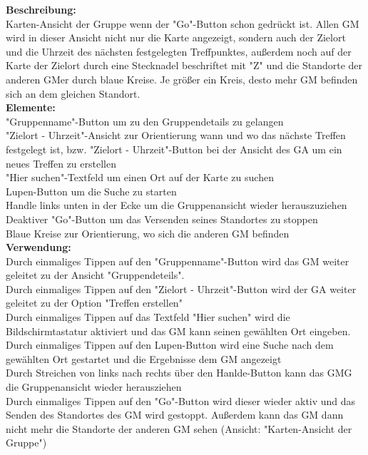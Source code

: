 \textbf{Beschreibung:}\\
Karten-Ansicht der Gruppe wenn der "Go"-Button schon gedrückt ist. Allen GM wird in dieser Ansicht nicht nur die Karte angezeigt, sondern auch der Zielort und die Uhrzeit des nächsten festgelegten Treffpunktes, außerdem noch auf der Karte der Zielort durch eine Stecknadel beschriftet mit "Z" und die Standorte der anderen GMer durch blaue Kreise. Je größer ein Kreis, desto mehr GM befinden sich an dem gleichen Standort.\\
\textbf{Elemente:}\\
"Gruppenname"-Button um zu den Gruppendetails zu gelangen\\
"Zielort - Uhrzeit"-Ansicht zur Orientierung wann und wo das nächste Treffen festgelegt ist, bzw. "Zielort - Uhrzeit"-Button bei der Ansicht des GA um ein neues Treffen zu erstellen\\
"Hier suchen"-Textfeld um einen Ort auf der Karte zu suchen\\
Lupen-Button um die Suche zu starten\\
Handle links unten in der Ecke um die Gruppenansicht wieder herauszuziehen\\
Deaktiver "Go"-Button um das Versenden seines Standortes zu stoppen\\
Blaue Kreise zur Orientierung, wo sich die anderen GM befinden\\
\textbf{Verwendung:}\\
Durch einmaliges Tippen auf den "Gruppenname"-Button wird das GM weiter geleitet zu der Ansicht "Gruppendeteils".\\
Durch einmaliges Tippen auf den "Zielort - Uhrzeit"-Button wird der GA weiter geleitet zu der Option "Treffen erstellen"\\
Durch einmaliges Tippen auf das Textfeld "Hier suchen" wird die Bildschirmtastatur aktiviert und das GM kann seinen gewählten Ort eingeben.\\
Durch einmaliges Tippen auf den Lupen-Button wird eine Suche nach dem gewählten Ort gestartet und die Ergebnisse dem GM angezeigt\\
Durch Streichen von links nach rechts über den Hanlde-Button kann das GMG die Gruppenansicht wieder herausziehen\\
Durch einmaliges Tippen auf den "Go"-Button wird dieser wieder aktiv und das Senden des Standortes des GM wird gestoppt. Außerdem kann das GM dann nicht mehr die Standorte der anderen GM sehen (Ansicht: "Karten-Ansicht der Gruppe")
\newpage


